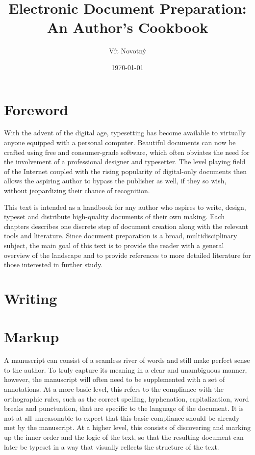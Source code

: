 \documentclass{book}
\title{Electronic Document Preparation: An Author's Cookbook}
\author{Vít Novotný}
\date{\today}
\begin{document}
  \frontmatter
    \maketitle
    \tableofcontents
  \mainmatter
    \chapter{Foreword}
      With the advent of the digital age, typesetting has become available to
      virtually anyone equipped with a personal computer. Beautiful documents
      can now be crafted using free and consumer-grade software, which often
      obviates the need for the involvement of a professional designer and
      typesetter. The level playing field of the Internet coupled with the
      rising popularity of digital-only documents then allows the aspiring
      author to bypass the publisher as well, if they so wish, without
      jeopardizing their chance of recognition.
      
      This text is intended as a handbook for any author who aspires to write,
      design, typeset and distribute high-quality documents of their own making.
      Each chapters describes one discrete step of document creation along with
      the relevant tools and literature. Since document preparation is a broad,
      multidisciplinary subject, the main goal of this text is to provide the
      reader with a general overview of the landscape and to provide references
      to more detailed literature for those interested in further study.

    \chapter{Writing}

    \chapter{Markup}
      A manuscript can consist of a seamless river of words and still make
      perfect sense to the author. To truly capture its meaning in a clear and
      unambiguous manner, however, the manuscript will often need to be
      supplemented with a set of annotations. At a more basic level, this refers
      to the compliance with the orthographic rules, such as the correct
      spelling, hyphenation, capitalization, word breaks and punctuation, that
      are specific to the language of the document. It is not at all
      unreasonable to expect that this basic compliance should be already met by
      the manuscript.  At a higher level, this consists of discovering and
      marking up the inner order and the logic of the text, so that the
      resulting document can later be typeset in a way that visually reflects
      the structure of the text.
      
\end{document}
